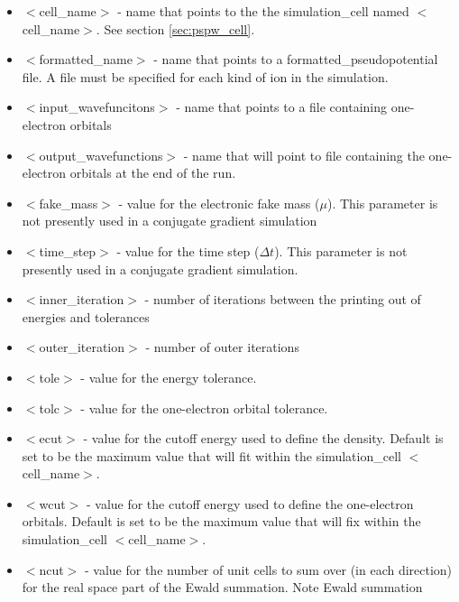 \begin{itemize}
        \item $<$cell\_name$>$ - name that points to the
              the simulation\_cell named $<$cell\_name$>$.  See section \ref{sec:pspw_cell}.
        \item $<$formatted\_name$>$ - name that points
              to a formatted\_pseudopotential file.  A file must
              be specified for each kind of ion in the simulation.
        \item $<$input\_wavefuncitons$>$ - name that points
              to a file containing one-electron orbitals
        \item $<$output\_wavefunctions$>$ - name that will
              point to file containing the one-electron orbitals at the
              end of the run. 
        \item $<$fake\_mass$>$ - value for the electronic
              fake mass ($\mu$). This parameter is not presently used in a 
              conjugate gradient simulation
        \item $<$time\_step$>$ - value for the time step ($\Delta t$).  This
              parameter is not presently used in a conjugate gradient simulation.
        \item $<$inner\_iteration$>$ - number of iterations between the 
              printing out of energies and tolerances
        \item $<$outer\_iteration$>$ - number of outer iterations
        \item $<$tole$>$ - value for the energy tolerance.
        \item $<$tolc$>$ - value for the one-electron orbital tolerance.
        \item $<$ecut$>$ - value for the cutoff energy used
                           to define the density. Default is set
                           to be the maximum value that will fit
                           within the simulation\_cell $<$cell\_name$>$.
        \item $<$wcut$>$ - value for the cutoff energy used
                           to define the one-electron orbitals.
                           Default is set to be the maximum value that 
                           will fix within the simulation\_cell $<$cell\_name$>$.
        \item $<$ncut$>$ - value for the number of unit cells
                          to sum over (in each direction) for the real space
                          part of the Ewald summation. Note Ewald summation

\end{itemize}
